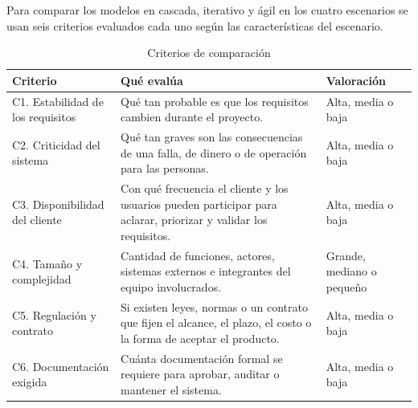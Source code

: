 Para comparar los modelos en cascada, iterativo y ágil en los cuatro escenarios se usan seis criterios evaluados cada uno según las características del escenario.

\begin{table}[H]
\centering\footnotesize
\caption{Criterios de comparación}\label{tab:criterios}
\begin{tabularx}{\textwidth}{@{}p{}Yp{0.17\textwidth}@{}}
\toprule
\textbf{Criterio} & \textbf{Qué evalúa} & \textbf{Valoración}\\
\midrule
C1. Estabilidad de los requisitos & Qué tan probable es que los requisitos cambien durante el proyecto. & Alta, media o baja\\
C2. Criticidad del sistema & Qué tan graves son las consecuencias de una falla, de dinero o de operación para las personas. & Alta, media o baja\\
C3. Disponibilidad del cliente & Con qué frecuencia el cliente y los usuarios pueden participar para aclarar, priorizar y validar los requisitos. & Alta, media o baja\\
C4. Tamaño y complejidad & Cantidad de funciones, actores, sistemas externos e integrantes del equipo involucrados. & Grande, mediano o pequeño\\
C5. Regulación y contrato & Si existen leyes, normas o un contrato que fijen el alcance, el plazo, el costo o la forma de aceptar el producto. & Alta, media o baja\\
C6. Documentación exigida & Cuánta documentación formal se requiere para aprobar, auditar o mantener el sistema. & Alta, media o baja\\
\bottomrule
\end{tabularx}
\end{table}
